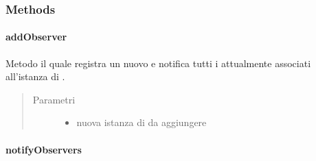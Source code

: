 \documentclass[letterpaper,10pt,italian,openany,oneside]{sphinxmanual}
\begin{document}
\subsubsection{Methods}
\label{\detokenize{source/it/unicam/cs/pa/mastermind/gamecore/Observable:methods}}

\paragraph{addObserver}
\label{\detokenize{source/it/unicam/cs/pa/mastermind/gamecore/Observable:addobserver}}

\begin{fulllineitems}
\label{\detokenize{source/it/unicam/cs/pa/mastermind/gamecore/Observable:it.unicam.cs.pa.mastermind.gamecore.Observable.addObserver(Observer)}}
Metodo il quale registra un nuovo  e notifica tutti i  attualmente associati all’istanza di .
\begin{quote}\begin{description}
\item[{Parametri}] \leavevmode\begin{itemize}
\item {} 
 \textendash{} nuova istanza di  da aggiungere

\end{itemize}

\end{description}\end{quote}

\end{fulllineitems}



\paragraph{notifyObservers}
\label{\detokenize{source/it/unicam/cs/pa/mastermind/gamecore/Observable:notifyobservers}}
\end{document}
